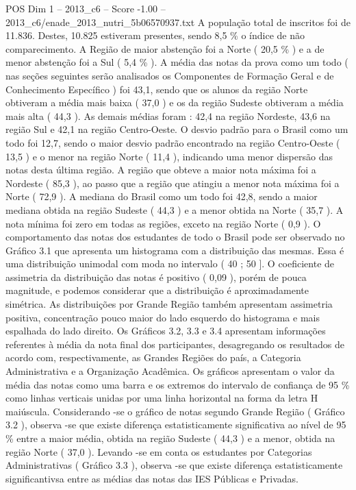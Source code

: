 \begin{textsample}{POS Dim 1 – 2013\_c6 – Score -1.00 – 2013\_c6/enade\_2013\_nutri\_5b06570937.txt}
A população total de inscritos foi de 11.836.
Destes, 10.825 estiveram presentes, sendo 8,5 \% o índice de não comparecimento.
A Região de maior abstenção foi a Norte ( 20,5 \% ) e a de menor abstenção foi a Sul ( 5,4 \% ).
A média das notas da prova como um todo ( nas seções seguintes serão analisados os Componentes de Formação Geral e de Conhecimento Específico ) foi 43,1, sendo que os alunos da região Norte obtiveram a média mais baixa ( 37,0 ) e os da região Sudeste obtiveram a média mais alta ( 44,3 ).
As demais médias foram : 42,4 na região Nordeste, 43,6 na região Sul e 42,1 na região Centro-Oeste.
O desvio padrão para o Brasil como um todo foi 12,7, sendo o maior desvio padrão encontrado na região Centro-Oeste ( 13,5 ) e o menor na região Norte ( 11,4 ), indicando uma menor dispersão das notas desta última região.
A região que obteve a maior nota máxima foi a Nordeste ( 85,3 ), ao passo que a região que atingiu a menor nota máxima foi a Norte ( 72,9 ).
A mediana do Brasil como um todo foi 42,8, sendo a maior mediana obtida na região Sudeste ( 44,3 ) e a menor obtida na Norte ( 35,7 ).
A nota mínima foi zero em todas as regiões, exceto na região Norte ( 0,9 ).
O comportamento das notas dos estudantes de todo o Brasil pode ser observado no Gráfico 3.1 que apresenta um histograma com a distribuição das mesmas.
Essa é uma distribuição unimodal com moda no intervalo ( 40 ; 50 ].
O coeficiente de assimetria da distribuição das notas é positivo ( 0,09 ), porém de pouca magnitude, e podemos considerar que a distribuição é aproximadamente simétrica.
As distribuições por Grande Região também apresentam assimetria positiva, concentração pouco maior do lado esquerdo do histograma e mais espalhada do lado direito.
Os Gráficos 3.2, 3.3 e 3.4 apresentam informações referentes à média da nota final dos participantes, desagregando os resultados de acordo com, respectivamente, as Grandes Regiões do país, a Categoria Administrativa e a Organização Acadêmica.
Os gráficos apresentam o valor da média das notas como uma barra e os extremos do intervalo de confiança de 95 \% como linhas verticais unidas por uma linha horizontal na forma da letra H maiúscula.
Considerando -se o gráfico de notas segundo Grande Região ( Gráfico 3.2 ), observa -se que existe diferença estatisticamente significativa ao nível de 95 \% entre a maior média, obtida na região Sudeste ( 44,3 ) e a menor, obtida na região Norte ( 37,0 ).
Levando -se em conta os estudantes por Categorias Administrativas ( Gráfico 3.3 ), observa -se que existe diferença estatisticamente significantivsa entre as médias das notas das IES Públicas e Privadas.

\end{textsample}
